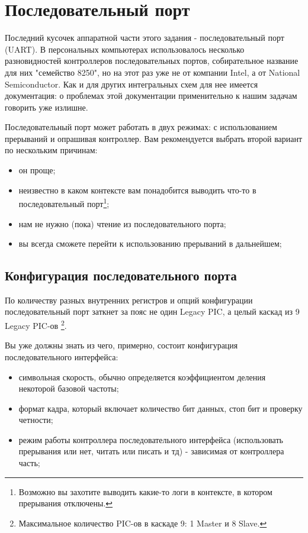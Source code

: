 \section{Последовательный порт}

Последний кусочек аппаратной части этого задания - последовательный порт (UART).
В персональных компьютерах использовалось несколько разновидностей контроллеров
последовательных портов, собирательное название для них "семейство 8250", но на
этот раз уже не от компании Intel, а от National Semiconductor. Как и для других
интегральных схем для нее имеется документация: \cite{NS:8250DS} о проблемах
этой документации применительно к нашим задачам говорить уже излишне.

Последовательный порт может работать в двух режимах: с использованием прерываний
и опрашивая контроллер. Вам рекомендуется выбрать второй вариант по нескольким
причинам:
\begin{itemize}
  \item он проще;
  \item неизвестно в каком контексте вам понадобится выводить что-то в
        последовательный порт\footnote{Возможно вы захотите выводить какие-то
        логи в контексте, в котором прерывания отключены.};
  \item нам не нужно (пока) чтение из последовательного порта;
  \item вы всегда сможете перейти к использованию прерываний в дальнейшем;
\end{itemize}

\subsection{Конфигурация последовательного порта}

По количеству разных внутренних регистров и опций конфигурации последовательный
порт заткнет за пояс не один Legacy PIC, а целый каскад из 9 Legacy PIC-ов
\footnote{Максимальное количество PIC-ов в каскаде 9: 1 Master и 8 Slave.}.

Вы уже должны знать из чего, примерно, состоит конфигурация последовательного
интерфейса:

\begin{itemize}
  \item символьная скорость, обычно определяется коэффициентом деления некоторой
        базовой частоты;
  \item формат кадра, который включает количество бит данных, стоп бит и
        проверку четности;
  \item режим работы контроллера последовательного интерфейса (использовать
        прерывания или нет, читать или писать и тд) - зависимая от контроллера
        часть;
\end{itemize}

